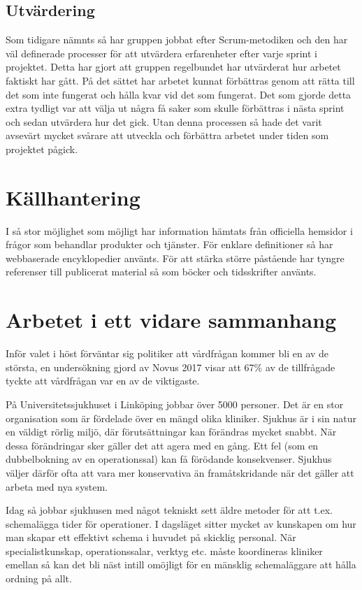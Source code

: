 \subsection{Utvärdering}
Som tidigare nämnts så har gruppen jobbat efter Scrum-metodiken och den har väl definerade processer för att utvärdera erfarenheter efter varje sprint i projektet. Detta har gjort att gruppen regelbundet har utvärderat hur arbetet faktiskt har gått. På det sättet har arbetet kunnat förbättras genom att rätta till det som inte fungerat och hålla kvar vid det som fungerat. Det som gjorde detta extra tydligt var att välja ut några få saker som skulle förbättras i nästa sprint och sedan utvärdera hur det gick. Utan denna processen så hade det varit avsevärt mycket svårare att utveckla och förbättra arbetet under tiden som projektet pågick.

\section{Källhantering} \label{sec:källhantering}
I så stor möjlighet som möjligt har information hämtats från officiella hemsidor i frågor som behandlar produkter och tjänster. För enklare definitioner så har webbaserade encyklopedier använts. För att stärka större påstående har tyngre referenser till publicerat material så som böcker och tidsskrifter använts.

\section{Arbetet i ett vidare sammanhang}\label{sec:vidare}

Inför valet i höst förväntar sig politiker att vårdfrågan kommer bli en av de största, en undersökning gjord av Novus 2017 visar att 67\% av de tillfrågade tyckte att vårdfrågan var en av de viktigaste.\cite{novus}

På Universitetssjukhuset i Linköping jobbar över 5000 personer. Det är en stor organisation som är fördelade över en mängd olika kliniker. Sjukhus är i sin natur en väldigt rörlig miljö, där förutsättningar kan förändras mycket snabbt. När dessa förändringar sker gäller det att agera med en gång. Ett fel (som en dubbelbokning av en operationssal) kan få förödande konsekvenser. Sjukhus väljer därför ofta att vara mer konservativa än framåtskridande när det gäller att arbeta med nya system.

Idag så jobbar sjukhusen med något tekniskt sett äldre metoder för att t.ex. schemalägga tider för operationer. I dagsläget sitter mycket av kunskapen om hur man skapar ett effektivt schema i huvudet på skicklig personal. När specialistkunskap, operationssalar, verktyg etc. måste koordineras kliniker emellan så kan det bli näst intill omöjligt för en mänsklig schemaläggare att hålla ordning på allt.


